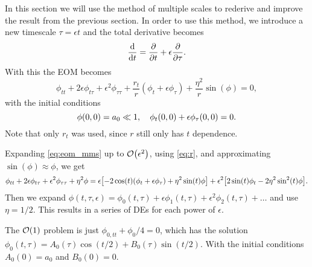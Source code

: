 In this section we will use the method of multiple scales to
rederive and improve the result from the previous section. In order to
use this method, we introduce a new timescale $\tau=\epsilon{t}$ and
the total derivative becomes
\begin{equation}
\dv{t}=\pdv{t}+\epsilon\pdv{\tau}.
\end{equation}
With this the EOM becomes
\begin{equation}\label{eq:eom_mms}
\phi_{tt}+2\epsilon\phi_{t\tau}+\epsilon^2\phi_{\tau\tau}
+\frac{r_t}{r}(\phi_t+\epsilon\phi_\tau)+\frac{\eta^2}{r}\sin(\phi)=0,
\end{equation}
with the initial conditions 
\begin{equation}\label{eq:inti_mms}
\phi(0, 0)=a_0\ll1\qcomma
\phi_t(0, 0)+\epsilon\phi_\tau(0, 0)=0.
\end{equation} 
Note that only $r_t$ was used, since $r$ still only has $t$
dependence. 

Expanding \eqref{eq:eom_mms} up to $\order{\epsilon^2}$, using
\eqref{eq:r}, and approximating $\sin(\phi)\approx\phi$, we get
\begin{equation}
\phi_{tt}+2\epsilon\phi_{t\tau}+\epsilon^2\phi_{\tau\tau}+\eta^2\phi
=%
\epsilon\qty[-2\cos(t)(\phi_t+\epsilon\phi_\tau)+\eta^2\sin(t)\phi]
+\epsilon^2\qty[2\sin(t)\phi_t-2\eta^2\sin^2(t)\phi].
\end{equation}
Then we expand 
$\phi(t,\tau,\epsilon)=\phi_0(t,\tau)+
\epsilon\phi_1(t,\tau)+\epsilon^2\phi_2(t,\tau)+\ldots$ and use
$\eta=1/2$. This results in a series of DEs for each power of
$\epsilon$. 

The $\order{1}$ problem is just $\phi_{0,tt}+\phi_0/4=0$, which has the
solution
$\phi_0(t,\tau)=A_0(\tau)\cos(t/2)+B_0(\tau)\sin(t/2)$.
With the initial conditions $A_0(0)=a_0$ and $B_0(0)=0$.

